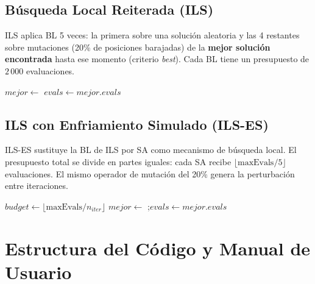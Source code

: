 \documentclass[12pt,a4paper]{article}
\begin{document}
\subsection{Búsqueda Local Reiterada (ILS)}

ILS aplica BL 5 veces: la primera sobre una solución aleatoria y las 4 restantes sobre
mutaciones (20\% de posiciones barajadas) de la \textbf{mejor solución encontrada} hasta
ese momento (criterio \textit{best}). Cada BL tiene un presupuesto de $2\,000$ evaluaciones.

\begin{algorithm}[H]
\caption{ILS (Búsqueda Local Reiterada)}
 
$mejor \leftarrow$ \;
$evals \leftarrow mejor.evals$\;
\end{algorithm}

\subsection{ILS con Enfriamiento Simulado (ILS-ES)}

ILS-ES sustituye la BL de ILS por SA como mecanismo de búsqueda local.
El presupuesto total se divide en partes iguales: cada SA recibe
$\lfloor \text{maxEvals}/5 \rfloor$ evaluaciones. El mismo operador de mutación del 20\%
genera la perturbación entre iteraciones.

\begin{algorithm}[H]
\caption{ILS-ES (ILS con Enfriamiento Simulado como subalgoritmo)}
 
$budget \leftarrow \lfloor \text{maxEvals} / n_{iter} \rfloor$\;
$mejor \leftarrow$ ;\quad $evals \leftarrow mejor.evals$\;
\end{algorithm}

\section{Estructura del Código y Manual de Usuario}
\end{document}
